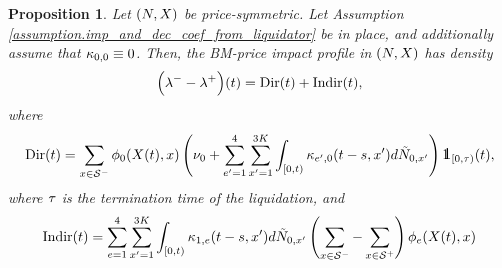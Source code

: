 \documentclass[10pt]{article}
\newtheorem{prop}[thm]{Proposition}
\begin{document}
\begin{prop}\label{prop.bm_impact}
 Let $(N,X)$ be price-symmetric. Let Assumption \ref{assumption.imp_and_dec_coef_from_liquidator} be in place, and additionally assume that $\kappa_{0,0} \equiv 0$. Then, the BM-price impact profile in $(N,X)$ has density
 \begin{equation}\label{eq.intensity_of_BM-impact}
 \Big(\lambda_{}^{-} - \lambda_{}^{+}\Big)(t)
  =\text{Dir}(t) + \text{Indir}(t),
  \end{equation}
  where 
  \begin{equation*}
   \directImpact(t)=  
  \sum_{x\in\deflationarySpace}\transProb_{0} (\stateVariable(t),x)
  \left(\baseRate_{0}  
  + \sum_{\eone=1}^{4}\sum_{\xone=1}^{3K} \int_{[0,t)} \hawkesKernel_{\eone,0}(t-s,\xone)d\hybridHawkes_{0,\xone}
  \right)
  \one_{[0,\terminationTime)} (t),
  \end{equation*}
 where $\tau$ is the termination time of the liquidation, and
 \begin{equation*}
  \text{Indir}(t)=
  \sum_{e=1}^{4}\sum_{x^{\prime}=1}^{3K} \int_{[0,t)} \kappa_{1,e}(t-s,x^{\prime})d\tilde{N}_{0,x^{\prime}}
  \left(
  \sum_{x\in\mathcal{S}^{-}}
  -
  \sum_{x\in\mathcal{S}^{+}}
  \right) \phi_{e}(X(t),x)
 \end{equation*}
\end{prop}
\end{document}
